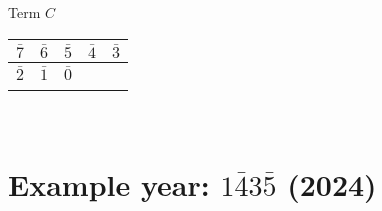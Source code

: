 \documentclass[12 pt]{article}%
\begin{document}
\begin{center}
  Term $C$ \\
  \begin{tabular}{|c|c|c|c|c|}
    \hline
    $ \bar 7 $ & $ \bar 6 $ & $ \bar 5 $ & $\bar 4$ & $\bar 3 $ \\
    \hline
    $ \bar 2 $ & $ \bar 1 $ & $ \bar 0 $ & & \\
    \hline
               & & & & \\
    \hline
  \end{tabular}\\
\end{center}

\newpage

\section{Example year: $1\bar43\bar5$ (2024)}
\end{document}
